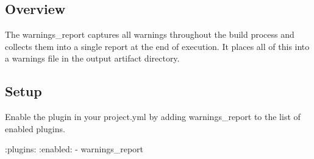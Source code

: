 \subsection*{Overview}

The warnings\+\_\+report captures all warnings throughout the build process and collects them into a single report at the end of execution. It places all of this into a warnings file in the output artifact directory.

\subsection*{Setup}

Enable the plugin in your project.\+yml by adding {\ttfamily warnings\+\_\+report} to the list of enabled plugins.


\begin{DoxyCode}
:plugins:
  :enabled:
    - warnings\_report
\end{DoxyCode}
 